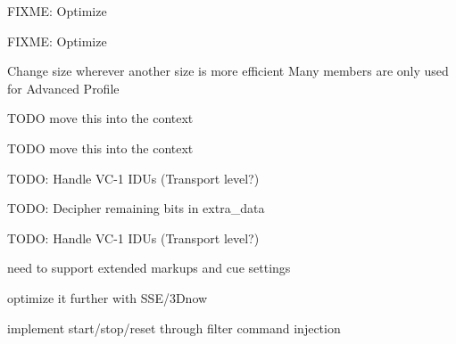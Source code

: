 \begin{DoxyRefList}
\item[Member \mbox{\hyperlink{vc1_8c_a99a192d961afdaf6dde51929d5c81054}{decode\+\_\+colskip}} (uint8\+\_\+t $\ast$plane, int width, int height, int stride, \mbox{\hyperlink{struct_get_bit_context}{Get\+Bit\+Context}} $\ast$gb)]\label{todo__todo000008}%
%
F\+I\+X\+ME\+: Optimize  
\item[Member \mbox{\hyperlink{vc1_8c_a4d10148afb08a2afc84499192ef28d1a}{bitplane\+\_\+decoding}} (uint8\+\_\+t $\ast$data, int $\ast$raw\+\_\+flag, \mbox{\hyperlink{struct_v_c1_context}{V\+C1\+Context}} $\ast$v)]\label{todo__todo000009}%
%
F\+I\+X\+ME\+: Optimize  
\item[Member \mbox{\hyperlink{vc1_8h_a466488db54b096cea65fd6e23a25df8c}{V\+C1\+Context}} ]\label{todo__todo000010}%
%
Change size wherever another size is more efficient Many members are only used for Advanced Profile  
\item[Module \mbox{\hyperlink{vc1data_8c_amgrpa65b249ee205472e61fad69d0a3174f4}{V\+C-\/1 V\+LC tables and defines}} ]\label{todo__todo000011}%
%
T\+O\+DO move this into the context  
\item[Module \mbox{\hyperlink{vc1data_8h_amgrpa65b249ee205472e61fad69d0a3174f4}{V\+C-\/1 V\+LC tables and defines}} ]\label{todo__todo000012}%
%
T\+O\+DO move this into the context  
\item[Member \mbox{\hyperlink{libavcodec_2vc1dec_8c_a1a38a22a9131f935ff4acafb3886f271}{vc1\+\_\+decode\+\_\+init}} (\mbox{\hyperlink{struct_a_v_codec_context}{A\+V\+Codec\+Context}} $\ast$avctx)]\label{todo__todo000013}%
%
T\+O\+DO\+: Handle V\+C-\/1 I\+D\+Us (Transport level?) 

\label{todo__todo000014}%
%
T\+O\+DO\+: Decipher remaining bits in extra\+\_\+data  
\item[Member \mbox{\hyperlink{libavcodec_2vc1dec_8c_a90fa43b89d3d7e8a7f6aefaddf8ea114}{vc1\+\_\+decode\+\_\+frame}} (\mbox{\hyperlink{struct_a_v_codec_context}{A\+V\+Codec\+Context}} $\ast$avctx, void $\ast$data, int $\ast$got\+\_\+frame, \mbox{\hyperlink{struct_a_v_packet}{A\+V\+Packet}} $\ast$avpkt)]\label{todo__todo000015}%
%
T\+O\+DO\+: Handle V\+C-\/1 I\+D\+Us (Transport level?)  
\item[File \mbox{\hyperlink{libavcodec_2webvttdec_8c}{webvttdec.c}} ]\label{todo__todo000016}%
%
need to support extended markups and cue settings  
\item[Member \mbox{\hyperlink{wmadec_8c_a6f9624e983c7f022df0083dc5ca6b4bb}{wma\+\_\+lsp\+\_\+to\+\_\+curve}} (\mbox{\hyperlink{struct_w_m_a_codec_context}{W\+M\+A\+Codec\+Context}} $\ast$s, float $\ast$out, float $\ast$val\+\_\+max\+\_\+ptr, int n, float $\ast$lsp)]\label{todo__todo000017}%
%
optimize it further with S\+S\+E/3\+Dnow  
\item[File \mbox{\hyperlink{f__ebur128_8c}{f\+\_\+ebur128.c}} ]\label{todo__todo000018}%
%
implement start/stop/reset through filter command injection 


\end{DoxyRefList}
